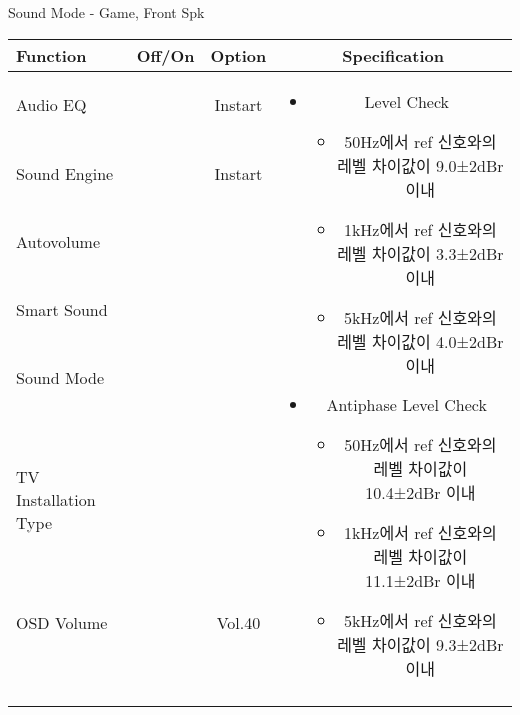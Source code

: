 \begin{frame}[t]{Sound Mode - Game, Front Spk}
\begin{tiny}
\begin{tabular}{@{}lccc@{}}
\toprule
Function & Off/On & Option & Specification \\
\midrule
Audio EQ & \color{black}{Off} & Instart &
\multirow{10}{60mm}{
\begin{itemize}
    \item Level Check
    \begin{itemize}
        \item 50Hz에서 ref 신호와의 레벨 차이값이 9.0±2dBr 이내
        \item 1kHz에서 ref 신호와의 레벨 차이값이 3.3±2dBr 이내
        \item 5kHz에서 ref 신호와의 레벨 차이값이 4.0±2dBr 이내
    \end{itemize}
    \item Antiphase Level Check
    \begin{itemize}
        \item 50Hz에서 ref 신호와의 레벨 차이값이 10.4±2dBr 이내
        \item 1kHz에서 ref 신호와의 레벨 차이값이 11.1±2dBr 이내
        \item 5kHz에서 ref 신호와의 레벨 차이값이 9.3±2dBr 이내
    \end{itemize}
\end{itemize}
} \\
Sound Engine & \color{blue}{On} & Instart & \\
Autovolume & \color{black}{Off} & & \\
Smart Sound & \color{black}{Off} & & \\
Sound Mode & \color{blue}{On} & \color{blue}{Game} & \\
TV Installation Type & \color{blue}{On} & \color{black}{Standtype1} & \\
OSD Volume & \color{blue}{On} & Vol.40 & \\
& & & \\
& & & \\
& & & \\
& & & \\
\midrule
\end{tabular}
\end{tiny}

\end{frame}


